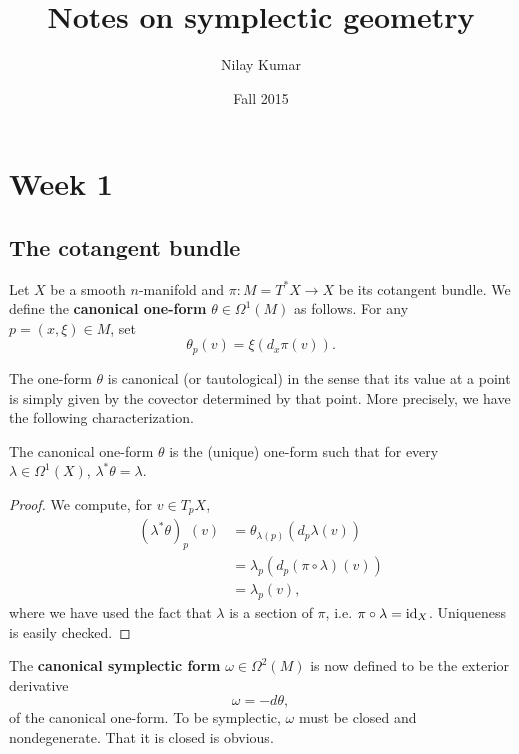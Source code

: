 \documentclass{amsart}
\title{Notes on symplectic geometry}
\author{Nilay Kumar}
\date{Fall 2015}
\begin{document}
\maketitle
\tableofcontents

\section{Week 1}

\subsection{The cotangent bundle}

\begin{definition}
Let $X$ be a smooth $n$-manifold and $\pi:M=T^*X\to X$ be its cotangent bundle. We define the
\textbf{canonical one-form} $\theta\in\Omega^1(M)$ as follows. For any $p=(x,\xi)\in M$,
set
\begin{equation*}
    \theta_p(v)=\xi( d_x\pi(v)).
\end{equation*}
\end{definition}

The one-form $\theta$ is canonical (or tautological) in the sense that its value at a point
is simply given by the covector determined by that point. More precisely, we have the following
characterization.

\begin{proposition}
    The canonical one-form $\theta$ is the (unique) one-form such that for every $\lambda\in\Omega^1(X)$,
    $\lambda^*\theta=\lambda$.
\end{proposition}
\begin{proof}
    We compute, for $v\in T_pX$,
    \begin{align*}
        (\lambda^*\theta)_p(v) &= \theta_{\lambda(p)}(d_p\lambda(v)) \\
        &= \lambda_p(d_p(\pi\circ\lambda)(v)) \\
        &= \lambda_p(v),
    \end{align*}
    where we have used the fact that $\lambda$ is a section of $\pi$, i.e. $\pi\circ\lambda=\operatorname{id}_X$.
    Uniqueness is easily checked.
\end{proof}

\begin{definition}
    The \textbf{canonical symplectic form} $\omega\in\Omega^2(M)$ is now defined to be the exterior
    derivative
    \begin{equation*}
        \omega = - d\theta,
    \end{equation*}
    of the canonical one-form. To be symplectic, $\omega$ must be closed and nondegenerate. That it
    is closed is obvious.
\end{definition}
\end{document}
